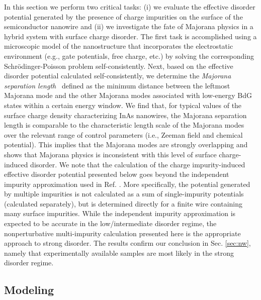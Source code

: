 \documentclass[aps,prmaterials,twocolumn,superscriptaddress,longbibliography]{revtex4-2}
\begin{document}
In this section we perform two critical tasks: (i) we evaluate the effective disorder potential generated by the presence of charge impurities on the surface of the semiconductor nanowire and (ii) we investigate the fate of Majorana physics in a hybrid system with surface charge disorder. The first task is accomplished using a microscopic model of the nanostructure that incorporates the electrostatic environment (e.g., gate potentials, free charge, etc.) by solving the corresponding Schr\"odinger-Poisson problem self-consistently. Next, based on the effective disorder potential calculated self-consistently, we determine the {\em Majorana separation length}~\cite{woods2021charge} defined as the minimum distance between the leftmost Majorana mode and the other Majorana modes associated with low-energy BdG states within a certain energy window.  We find that, for typical values of the surface charge density characterizing InAs nanowires, the Majorana separation length is comparable to the characteristic length scale of the Majorana modes over the relevant range of control parameters (i.e., Zeeman field and chemical potential). This implies that the Majorana modes are strongly overlapping and shows that Majorana physics is inconsistent with this level of surface charge-induced disorder. We note that the calculation of the charge impurity-induced effective disorder potential presented below goes beyond the independent impurity approximation used in Ref. . More specifically, the potential generated by multiple impurities is not calculated as a sum of single-impurity potentials (calculated separately), but is determined directly for a finite wire containing many surface impurities. While the independent impurity approximation is expected to be accurate in the low/intermediate disorder regime, the nonperturbative multi-impurity calculation presented here is the appropriate approach to strong disorder. The results confirm our conclusion in Sec. \ref{sec:nw}, namely that experimentally available samples are most likely in the strong disorder regime.

\subsection{Modeling} \label{sec:SC} %
\end{document}
